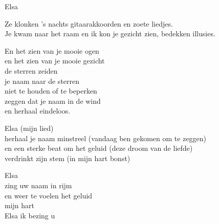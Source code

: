 \begin{song}[tango]{Elsa}
\clearpage
\begin{translation}
Ze klonken 's nachts gitaarakkoorden en zoete liedjes.\\
Je kwam naar het raam en ik kon je gezicht zien, bedekken illusies.\vspace{\wlskip}

En het zien van je mooie ogen\\
en het zien van je mooie gezicht\\
de sterren zeiden\\
je naam naar de sterren\\
niet te houden of te beperken\\
zeggen dat je naam in de wind\\
en herhaal eindeloos.\vspace{\wlskip}

Elsa (mijn lied)\\
herhaal je naam minstreel (vandaag ben gekomen om te zeggen)\\
en een sterke beat om het geluid (deze droom van de liefde)\\
verdrinkt zijn stem (in mijn hart bonst)\vspace{\wlskip}

Elsa\\
zing uw naam in rijm\\
en weer te voelen het geluid\\
mijn hart\\
Elsa ik bezing u
\end{translation}
\end{song}
